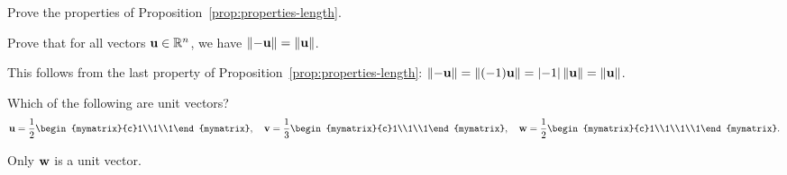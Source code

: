 \begin{ex}
  Prove the properties of Proposition~\ref{prop:properties-length}.
\end{ex}

\begin{ex}
  Prove that for all vectors $\vect{u}\in\R^n$, we have
  $\norm{-\vect{u}} = \norm{\vect{u}}$.
  \begin{sol}
    This follows from the last property of
    Proposition~\ref{prop:properties-length}: $\norm{-\vect{u}} =
    \norm{(-1)\vect{u}} = \abs{-1}\norm{\vect{u}} = \norm{\vect{u}}$.
  \end{sol}
\end{ex}

\begin{ex}
  Which of the following are unit vectors?
  \begin{equation*}
    \vect{u}=\frac{1}{2}\begin{mymatrix}{c}1\\1\\1\end{mymatrix}, \quad
    \vect{v}=\frac{1}{3}\begin{mymatrix}{c}1\\1\\1\end{mymatrix}, \quad
    \vect{w}=\frac{1}{2}\begin{mymatrix}{c}1\\1\\1\\1\end{mymatrix}.
  \end{equation*}
  \begin{sol}
    Only $\vect{w}$ is a unit vector.
  \end{sol}
\end{ex}


